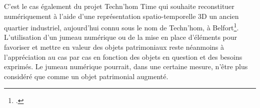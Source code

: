 C’est le cas également du projet Techn’hom Time qui souhaite reconstituer numériquement à l’aide d’une représentation spatio-temporelle 3D un ancien quartier industriel, aujourd’hui connu sous le nom de Techn’hom, à Belfort\footcite{gasnierTechnHomTime2020}.\\

L’utilisation d’un jumeau numérique ou de la mise en place d’éléments pour favoriser et mettre en valeur des objets patrimoniaux reste néanmoins à l’appréciation au cas par cas en fonction des objets en question et des besoins exprimés. Le jumeau numérique pourrait, dans une certaine mesure, n’être plus considéré que comme un objet patrimonial augmenté. \\